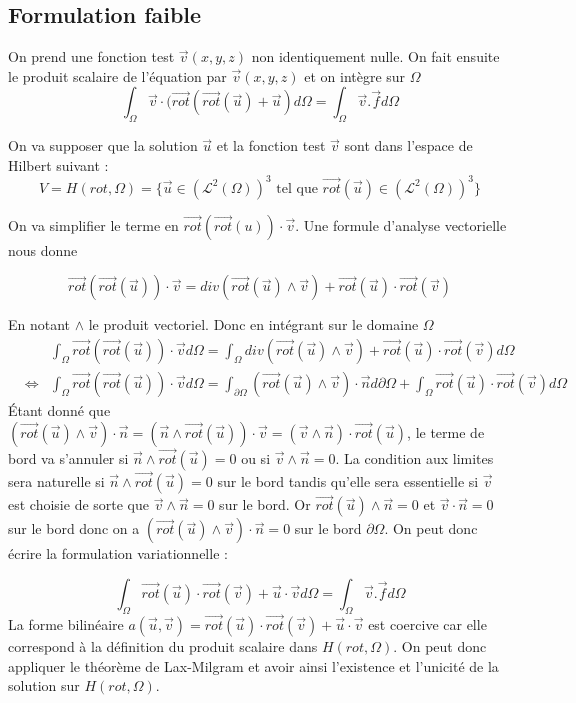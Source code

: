 \documentclass[a4paper,12pt]{article}
\begin{document}
\subsection{Formulation faible}
On prend une fonction test $\vec{v}(x,y,z)$ non identiquement nulle. 
On fait ensuite le produit scalaire de l'équation par $\vec{v}(x,y,z)$ et on intègre sur $\Omega$
\[
\int_{\Omega} {\vec{v}\cdot(\vec{rot}(\vec{rot}(\vec{u}) + \vec{u}) d\Omega} = \int_{\Omega} {\vec{v}.\vec{f} d\Omega}
\]

On va supposer que la solution $\vec{u}$ et la fonction test $\vec{v}$ sont dans l'espace de Hilbert suivant :
\[
V=H(rot, \Omega) =
\{ \vec{u} \in (\mathcal{L}^{2}(\Omega))^{3} \text{ tel que } \vec{rot}(\vec{u}) \in (\mathcal{L}^{2}(\Omega))^{3}
\}
\]

On va simplifier le terme en $\vec{rot}(\vec{rot}(u)) \cdot \vec{v}$. Une formule d'analyse vectorielle nous donne

\[
\vec{rot}(\vec{rot}(\vec{u})) \cdot \vec{v} = div(\vec{rot}(\vec{u}) \wedge \vec{v}) + \vec{rot}(\vec{u}) \cdot \vec{rot}(\vec{v})
\]

En notant $\wedge$ le produit vectoriel. Donc en intégrant sur le domaine $\Omega$
\begin{eqnarray*}
& &\int_{\Omega} {\vec{rot}(\vec{rot}(\vec{u})) \cdot \vec{v}} d\Omega = \int_{\Omega} {div(\vec{rot}(\vec{u}) \wedge \vec{v}) + \vec{rot}(\vec{u}) \cdot \vec{rot}(\vec{v})} d\Omega \\
&\Leftrightarrow& \int_{\Omega} {\vec{rot}(\vec{rot}(\vec{u})) \cdot \vec{v}} d\Omega = \int_{\partial \Omega} {(\vec{rot}(\vec{u}) \wedge \vec{v})\cdot\vec{n}} d\partial\Omega + \int_{\Omega} {\vec{rot}(\vec{u}) \cdot \vec{rot}(\vec{v})} d\Omega
\end{eqnarray*}
 Étant donné que $(\vec{rot}(\vec{u}) \wedge \vec{v}) \cdot \vec{n} = 
(\vec{n} \wedge \vec{rot}(\vec{u})) \cdot \vec{v} = 
(\vec{v} \wedge \vec{n}) \cdot \vec{rot}(\vec{u})$, le terme de bord va s'annuler si
$\vec{n} \wedge \vec{rot}(\vec{u}) = 0$ ou si $\vec{v} \wedge \vec{n}=0$.
La condition aux limites sera naturelle si $\vec{n} \wedge \vec{rot}(\vec{u}) = 0$ sur le bord
tandis qu'elle sera essentielle si $\vec{v}$ est choisie de sorte que $\vec{v} \wedge \vec{n}=0$ sur le bord.
Or $\vec{rot}(\vec{u}) \wedge \vec{n} = 0$ et $\vec{v}\cdot\vec{n}=0$ sur le bord donc on a $(\vec{rot}(\vec{u}) \wedge \vec{v})\cdot \vec{n} = 0$ sur le bord $\partial \Omega$.
On peut donc écrire la formulation variationnelle :

\[
\int_{\Omega} {\vec{rot}(\vec{u})\cdot\vec{rot}(\vec{v}) + \vec{u}\cdot\vec{v} d\Omega} = \int_{\Omega} {\vec{v}.\vec{f} d\Omega}
\]
La forme bilinéaire $a(\vec{u},\vec{v}) = \vec{rot}(\vec{u})\cdot\vec{rot}(\vec{v}) + \vec{u}\cdot\vec{v}$ est coercive
car elle correspond à la définition du produit scalaire dans $H(rot, \Omega)$. 
On peut donc appliquer le théorème de Lax-Milgram et avoir ainsi l'existence et l'unicité de la solution sur $H(rot, \Omega)$.
\end{document}
